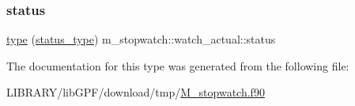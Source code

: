 \mbox{\label{structm__stopwatch_1_1watch__actual_aa5946ce38edc266e09dfc0a12a33710c}} 
\subsubsection{\texorpdfstring{status}{status}}
{\footnotesize\ttfamily \hyperlink{stop__watch_83_8txt_a70f0ead91c32e25323c03265aa302c1c}{type} (\hyperlink{structm__stopwatch_1_1status__type}{status\+\_\+type}) m\+\_\+stopwatch\+::watch\+\_\+actual\+::status\hspace{0.3cm}{\ttfamily [private]}}



The documentation for this type was generated from the following file\+:\begin{DoxyCompactItemize}
\item 
L\+I\+B\+R\+A\+R\+Y/lib\+G\+P\+F/download/tmp/\hyperlink{M__stopwatch_8f90}{M\+\_\+stopwatch.\+f90}\end{DoxyCompactItemize}
